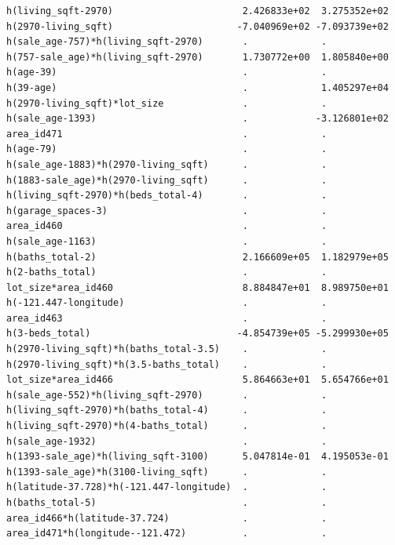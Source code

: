 \documentclass[
]{article}
\begin{document}
\begin{verbatim}
h(living_sqft-2970)                       2.426833e+02  3.275352e+02
h(2970-living_sqft)                      -7.040969e+02 -7.093739e+02
h(sale_age-757)*h(living_sqft-2970)       .             .           
h(757-sale_age)*h(living_sqft-2970)       1.730772e+00  1.805840e+00
h(age-39)                                 .             .           
h(39-age)                                 .             1.405297e+04
h(2970-living_sqft)*lot_size              .             .           
h(sale_age-1393)                          .            -3.126801e+02
area_id471                                .             .           
h(age-79)                                 .             .           
h(sale_age-1883)*h(2970-living_sqft)      .             .           
h(1883-sale_age)*h(2970-living_sqft)      .             .           
h(living_sqft-2970)*h(beds_total-4)       .             .           
h(garage_spaces-3)                        .             .           
area_id460                                .             .           
h(sale_age-1163)                          .             .           
h(baths_total-2)                          2.166609e+05  1.182979e+05
h(2-baths_total)                          .             .           
lot_size*area_id460                       8.884847e+01  8.989750e+01
h(-121.447-longitude)                     .             .           
area_id463                                .             .           
h(3-beds_total)                          -4.854739e+05 -5.299930e+05
h(2970-living_sqft)*h(baths_total-3.5)    .             .           
h(2970-living_sqft)*h(3.5-baths_total)    .             .           
lot_size*area_id466                       5.864663e+01  5.654766e+01
h(sale_age-552)*h(living_sqft-2970)       .             .           
h(living_sqft-2970)*h(baths_total-4)      .             .           
h(living_sqft-2970)*h(4-baths_total)      .             .           
h(sale_age-1932)                          .             .           
h(1393-sale_age)*h(living_sqft-3100)      5.047814e-01  4.195053e-01
h(1393-sale_age)*h(3100-living_sqft)      .             .           
h(latitude-37.728)*h(-121.447-longitude)  .             .           
h(baths_total-5)                          .             .           
area_id466*h(latitude-37.724)             .             .           
area_id471*h(longitude--121.472)          .             .           
                                                                    

\end{verbatim}
\end{document}
